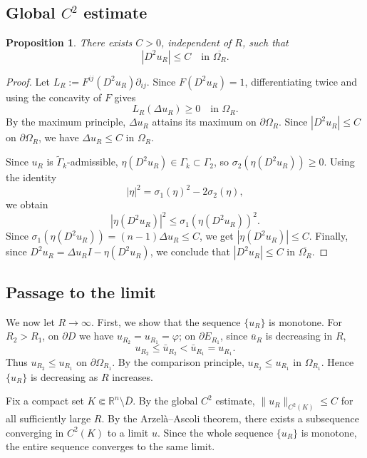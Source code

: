 \documentclass[reqno,a4paper]{amsart}
\numberwithin{equation}{section}
\newtheorem{proposition}{Proposition}[section]
\begin{document}
	\subsection{Global \(C^2\) estimate}
	
	\begin{proposition}
		There exists $C > 0$, independent of $R$, such that
		\[
		|D^2 u_R| \le C \quad \text{in } \overline{\Omega_R}.
		\]
	\end{proposition}
	
	\begin{proof}
		Let $L_R := F^{ij}(D^2 u_R) \partial_{ij}$. Since $F(D^2 u_R) = 1$, differentiating twice and using the concavity of $F$ gives
		\begin{equation}
			L_R(\Delta u_R) \ge 0 \quad \text{in } \Omega_R.
		\end{equation}
		By the maximum principle, $\Delta u_R$ attains its maximum on $\partial \Omega_R$. Since $|D^2 u_R| \le C$ on $\partial \Omega_R$, we have $\Delta u_R \le C$ in $\Omega_R$.
		
		Since $u_R$ is $\widetilde{\Gamma}_k$-admissible, $\eta(D^2 u_R) \in \Gamma_k \subset \Gamma_2$, so $\sigma_2(\eta(D^2 u_R)) \ge 0$. Using the identity
		\[
		|\eta|^2 = \sigma_1(\eta)^2 - 2\sigma_2(\eta),
		\]
		we obtain
		\[
		|\eta(D^2 u_R)|^2 \le \sigma_1(\eta(D^2 u_R))^2.
		\]
		Since $\sigma_1(\eta(D^2 u_R)) = (n-1)\Delta u_R \le C$, we get $|\eta(D^2 u_R)| \le C$. Finally, since $D^2 u_R = \Delta u_R I - \eta(D^2 u_R)$, we conclude that $|D^2 u_R| \le C$ in $\overline{\Omega_R}$.
	\end{proof}
	
	\subsection{Passage to the limit}
	
	We now let $R \to \infty$. First, we show that the sequence $\{u_R\}$ is monotone. For $R_2 > R_1$, on $\partial D$ we have $u_{R_2} = u_{R_1} = \varphi$; on $\partial E_{R_1}$, since $\bar{u}_R$ is decreasing in $R$,
	\[
	u_{R_2} \le \bar{u}_{R_2} < \bar{u}_{R_1} = u_{R_1}.
	\]
	Thus $u_{R_2} \le u_{R_1}$ on $\partial \Omega_{R_1}$. By the comparison principle, $u_{R_2} \le u_{R_1}$ in $\Omega_{R_1}$. Hence $\{u_R\}$ is decreasing as $R$ increases.
	
	Fix a compact set $K \Subset \mathbb{R}^n \setminus \overline{D}$. By the global $C^2$ estimate, $\|u_R\|_{C^2(K)} \le C$ for all sufficiently large $R$. By the Arzel\`a--Ascoli theorem, there exists a subsequence converging in $C^2(K)$ to a limit $u$. Since the whole sequence $\{u_R\}$ is monotone, the entire sequence converges to the same limit.
	
\end{document}
